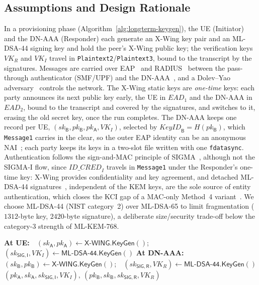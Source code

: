 \documentclass[symmetry,article,submit,moreauthors]{Definitions/mdpi}
\newcommand{\XWING}{\mathsf{X\text{-}WING}}
\begin{document}
\subsection{Assumptions and Design Rationale}
In a provisioning phase (Algorithm~\ref{alg:longterm-keygen}), the UE (Initiator) and the DN-AAA (Responder) each generate an X-Wing key pair and an ML-DSA-44 signing key and hold the peer's X-Wing public key; the verification keys $VK_R$ and $VK_I$ travel in \texttt{Plaintext2}/\texttt{Plaintext3}, bound to the transcript by the signatures. Messages are carried over EAP~\cite{RFC3748} and RADIUS~\cite{RFC2865,RFC3579} between the pass-through authenticator (SMF/UPF) and the DN-AAA~\cite{TS33501}, and a Dolev--Yao adversary~\cite{DolevYao1983} controls the network. The X-Wing static keys are \emph{one-time} keys: each party announces its next public key early, the UE in $\mathit{EAD}_1$ and the DN-AAA in $\mathit{EAD}_2$, bound to the transcript and covered by the signatures, and switches to it, erasing the old secret key, once the run completes. The DN-AAA keeps one record per UE, $(sk_{\mathsf{B}}, pk_{\mathsf{B}}, pk_{\mathsf{A}}, VK_I)$, selected by $\mathit{KeyID}_{\mathsf{B}} = H(pk_{\mathsf{B}})$, which \texttt{Message1} carries in the clear, so the outer EAP identity can be an anonymous NAI~\cite{RFC7542}; each party keeps its keys in a two-slot file written with one \texttt{fdatasync}. Authentication follows the sign-and-MAC principle of SIGMA~\cite{Kra03}, although not the SIGMA-I flow, since $\mathit{ID\_CRED}_I$ travels in \texttt{Message1} under the Responder's one-time key: X-Wing provides confidentiality and key agreement, and detached ML-DSA-44 signatures~\cite{FIPS204}, independent of the KEM keys, are the sole source of entity authentication, which closes the KCI gap of a MAC-only Method~4 variant~\cite{GM23,CDM24}. We choose ML-DSA-44 (NIST category~2) over ML-DSA-65 to limit fragmentation ($1312$-byte key, $2420$-byte signature), a deliberate size/security trade-off below the category-3 strength of ML-KEM-768.

\begin{algorithm}[H]
\caption{Long-term key generation (provisioning)}
\label{alg:longterm-keygen}
{\footnotesize
\begin{algorithmic}[1]
\State \textbf{At UE:}\ \ $(sk_{\mathsf{A}}, pk_{\mathsf{A}}) \gets \XWING.\mathsf{KeyGen}()$;\ \ $(sk_{\mathsf{SIG,I}}, VK_I) \gets \mathsf{ML\text{-}DSA\text{-}44.KeyGen}()$
\State \textbf{At DN-AAA:}\ \ $(sk_{\mathsf{B}}, pk_{\mathsf{B}}) \gets \XWING.\mathsf{KeyGen}()$;\ \ $(sk_{\mathsf{SIG,R}}, VK_R) \gets \mathsf{ML\text{-}DSA\text{-}44.KeyGen}()$
\State \Return $(pk_{\mathsf{A}}, sk_{\mathsf{A}}, sk_{\mathsf{SIG,I}}, VK_I),\ (pk_{\mathsf{B}}, sk_{\mathsf{B}}, sk_{\mathsf{SIG,R}}, VK_R)$
\end{algorithmic}
}
\end{algorithm}
\end{document}
